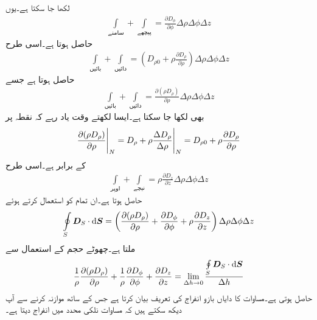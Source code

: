 لکھا جا سکتا ہے۔یوں
\begin{align*}
\int \limits_{\text{سامنے}}+\int\limits_{\text{پیچھے}}=\frac{\partial D_{\phi}}{\partial \phi} \Delta \rho \Delta \phi \Delta z
\end{align*}
حاصل ہوتا ہے۔اسی طرح
\begin{align*}
\int \limits_{\text{بائیں}}+\int \limits_{\text{دائیں}}=\left(D_{\rho 0} +\rho \frac{\partial D_{\rho}}{\partial \rho} \right) \Delta \rho \Delta \phi \Delta z
\end{align*}
حاصل ہوتا ہے جسے
\begin{align*}
\int \limits_{\text{بائیں}}+\int \limits_{\text{دائیں}}=\frac{\partial (\rho D_{\rho})}{\partial \rho}  \Delta \rho \Delta \phi \Delta z
\end{align*}
بھی لکھا جا سکتا ہے۔ایسا لکھتے وقت یاد رہے کہ نقطہ  پر
\begin{align*}
\eval{\frac{\partial (\rho D_{\rho})}{\partial \rho}}_{N}=\eval{D_{\rho}+\rho \frac{\Delta D_{\rho}}{\Delta \rho}}_{N}=D_{\rho 0} +\rho \frac{\partial D_{\rho}}{\partial \rho}
\end{align*}
کے برابر ہے۔اسی طرح
\begin{align*}
\int \limits_{\text{اوپر}}+\int\limits_{\text{نیچے}}=\rho \frac{\partial D_{z}}{\partial z} \Delta \rho \Delta \phi \Delta z
\end{align*}
حاصل ہوتا ہے۔ان تمام کو استعمال کرتے ہوئے
\begin{align*}
\oint\limits_{S} \kvec{D}_S \cdot \dif \kvec{S}=\left(\frac{\partial (\rho D_{\rho})}{\partial \rho}+\frac{\partial D_{\phi}}{\partial \phi}  + \rho \frac{\partial D_{z}}{\partial z}   \right)\Delta \rho \Delta \phi \Delta z
\end{align*}
ملتا ہے۔چھوٹے حجم  کے استعمال سے
\begin{align}\label{مساوات_گاوس_نلکی_پھیلاو_کی_تعریف}
\frac{1}{\rho}\frac{\partial (\rho D_{\rho})}{\partial \rho}+\frac{1}{\rho}\frac{\partial D_{\phi}}{\partial \phi}  +  \frac{\partial D_{z}}{\partial z}=\lim_{\Delta h \to 0} \frac{\oint\limits_{S} \kvec{D}_S \cdot \dif \kvec{S}}{\Delta h}
\end{align}
حاصل ہوتی ہے۔مساوات  کا دایاں بازو انفراج کی تعریف بیان کرتا ہے جس کے ساتھ موازنہ کرنے سے آپ دیکھ سکتے ہیں کہ مساوات  نلکی محدد میں انفراج  دیتا ہے۔

